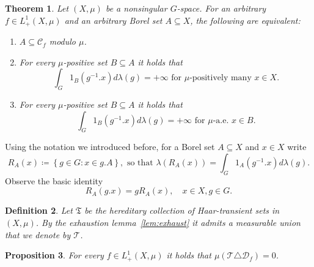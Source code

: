 \documentclass{amsart}
\numberwithin{equation}{subsection}
\newtheorem{thm}{Theorem}[section]
\newtheorem{prop}[thm]{Proposition}
\newtheorem{defn}[thm]{Definition}
\begin{document}
\begin{thm}
\label{thm:recurrence}
Let \(\left(X,\mu\right)\) be a nonsingular \(G\)-space. For an arbitrary \(f\in L_{+}^{1}\left(X,\mu\right)\) and an arbitrary Borel set \(A\subseteq X\), the following are equivalent:
\begin{enumerate}
    \item \(A\subseteq\mathcal{C}_{f}\) modulo \(\mu\).
    \item For every \(\mu\)-positive set \(B\subseteq A\) it holds that
    \[\int_{G}1_{B}\left(g^{-1}.x\right)d\lambda\left(g\right)=+\infty\text{ for }\mu\text{-positively many }x\in X.\]
    \item For every \(\mu\)-positive set \(B\subseteq A\) it holds that
    \[\int_{G}1_{B}\left(g^{-1}.x\right)d\lambda\left(g\right)=+\infty\text{ for }\mu\text{-a.e. }x\in B.\]
\end{enumerate}
\end{thm}

Using the notation we introduced before, for a Borel set \(A\subseteq X\) and \(x\in X\) write
\[R_{A}\left(x\right)\coloneqq \left\{ g\in G:x\in g.A\right\},\text{ so that }\lambda\left(R_{A}\left(x\right)\right)=\int_{G}1_{A}\left(g^{-1}.x\right)d\lambda\left(g\right).\]
Observe the basic identity
\begin{equation}
\label{eq:riden}
R_{A}\left(g.x\right)=gR_{A}\left(x\right),\quad x\in X, g\in G.
\end{equation}

\begin{defn}
Let \(\mathfrak{T}\) be the hereditary collection of Haar-transient sets in \(\left(X,\mu\right)\). By the exhaustion lemma~\ref{lem:exhaust} it admits a measurable union that we denote by \(\mathcal{T}\).
\end{defn}

\begin{prop}
\label{prop:recurrence}
For every \(f\in L_{+}^{1}\left(X,\mu\right)\) it holds that \(\mu\left(\mathcal{T}\triangle\mathcal{D}_{f}\right)=0\).
\end{prop}
\end{document}
